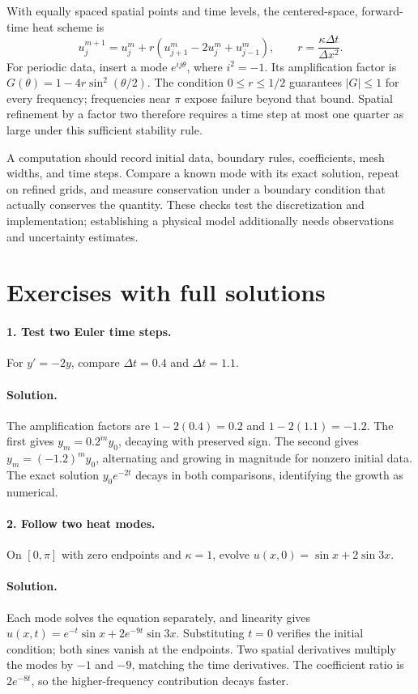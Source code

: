 With equally spaced spatial points and time levels, the centered-space,
forward-time heat scheme is
\[
 u_j^{m+1}=u_j^m+r(u_{j+1}^m-2u_j^m+u_{j-1}^m),\qquad
 r=\frac{\kappa\Delta t}{\Delta x^2}.
\]
For periodic data, insert a mode $e^{ij\theta}$, where $i^2=-1$.
Its amplification factor is
$G(\theta)=1-4r\sin^2(\theta/2)$. The condition $0\leq r\leq1/2$
guarantees $|G|\leq1$ for every frequency; frequencies near $\pi$ expose
failure beyond that bound. Spatial refinement by a factor two therefore
requires a time step at most one quarter as large under this sufficient
stability rule.

A computation should record initial data, boundary rules, coefficients,
mesh widths, and time steps. Compare a known mode with its exact solution,
repeat on refined grids, and measure conservation under a boundary condition
that actually conserves the quantity. These checks test the discretization
and implementation; establishing a physical model additionally needs
observations and uncertainty estimates.

\section{Exercises with full solutions}
\paragraph{1. Test two Euler time steps.}
For $y'=-2y$, compare $\Delta t=0.4$ and $\Delta t=1.1$.

\paragraph{Solution.}
The amplification factors are $1-2(0.4)=0.2$ and
$1-2(1.1)=-1.2$. The first gives $y_m=0.2^my_0$, decaying with
preserved sign. The second gives $y_m=(-1.2)^my_0$, alternating and
growing in magnitude for nonzero initial data. The exact solution
$y_0e^{-2t}$ decays in both comparisons, identifying the growth as numerical.

\paragraph{2. Follow two heat modes.}
On $[0,\pi]$ with zero endpoints and $\kappa=1$, evolve
$u(x,0)=\sin x+2\sin3x$.

\paragraph{Solution.}
Each mode solves the equation separately, and linearity gives
$u(x,t)=e^{-t}\sin x+2e^{-9t}\sin3x$. Substituting $t=0$ verifies
the initial condition; both sines vanish at the endpoints. Two spatial
derivatives multiply the modes by $-1$ and $-9$, matching the time
derivatives. The coefficient ratio is $2e^{-8t}$, so the higher-frequency
contribution decays faster.

